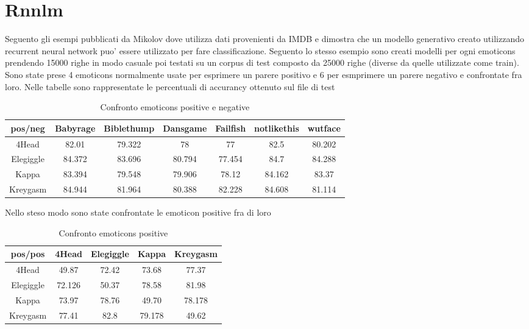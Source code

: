 \documentclass[a4paper,11pt]{book}
\theoremstyle{definition}
\begin{document}
\chapter{Rnnlm}
\label{ch:rnnlm}
Seguento gli esempi pubblicati da Mikolov dove utilizza dati provenienti da IMDB e dimostra che un  modello generativo creato utilizzando recurrent neural network  puo' essere utilizzato per fare classificazione. Seguento lo stesso esempio sono creati modelli per ogni emoticons prendendo 15000 righe in modo casuale poi testati su un corpus di test composto da 25000 righe (diverse da quelle utilizzate come train).
Sono state prese 4 emoticons normalmente usate per esprimere un parere positivo e 6 per esmprimere un parere negativo e confrontate fra loro. Nelle tabelle sono rappresentate le percentuali di accurancy ottenuto sul file di test
\begin{table}[h]
\begin{center}
\begin{tabular}{|c|c|c|c|c|c|c|}
\hline
pos/neg & Babyrage & Biblethump & Dansgame & Failfish & notlikethis & wutface \\
\hline
\hline
4Head & 82.01 &  79.322 & 78 & 77 & 82.5 & 80.202 \\
\hline
Elegiggle & 84.372 & 83.696 & 80.794 & 77.454 & 84.7 & 84.288 \\
\hline
Kappa & 83.394 & 79.548 & 79.906 & 78.12 & 84.162 & 83.37 \\
\hline
Kreygasm & 84.944 & 81.964 & 80.388 & 82.228 & 84.608 & 81.114 \\
\hline
\end{tabular}
\end{center}
\caption{Confronto emoticons positive e negative}
\label{tab:rnnlmTest1}
\end{table}

Nello steso modo sono state confrontate le emoticon positive fra di loro
\begin{table}[h]
\begin{center}
\begin{tabular}{|c|c|c|c|c|}
\hline
pos/pos & 4Head & Elegiggle & Kappa & Kreygasm \\
\hline
\hline
4Head & 49.87 &  72.42 & 73.68 & 77.37 \\
\hline
Elegiggle & 72.126 & 50.37 & 78.58 & 81.98 \\
\hline
Kappa & 73.97 & 78.76 & 49.70 & 78.178 \\
\hline
Kreygasm & 77.41 & 82.8 & 79.178 & 49.62 \\
\hline
\end{tabular}
\end{center}
\caption{Confronto emoticons positive}
\label{tab:rnnlmTest2 }
\end{table}
\end{document}
